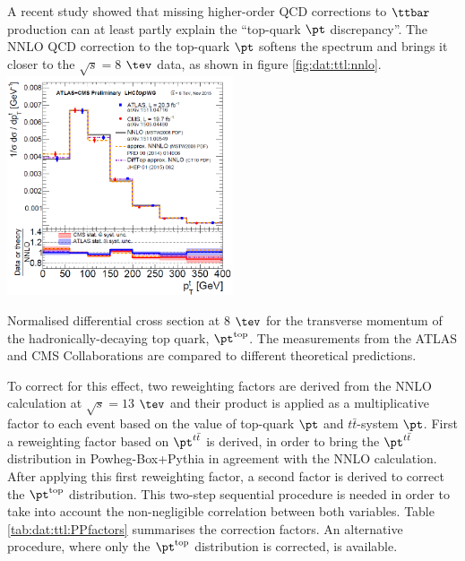 



A recent study \cite{PhysRevD.90.014006,Guzzi:2014wia} showed that missing higher-order QCD corrections to $\ttbar$ production can at least partly explain the ``top-quark $\pt$ discrepancy''. The NNLO QCD correction to the top-quark $\pt$ softens the spectrum and brings it closer to the $\sqrt{s}=8$ $\tev$ data, as shown in figure \ref{fig:dat:ttl:nnlo}.
\bfig[h!]
\centering
\includegraphics[width=0.5\textwidth]{figures/Datasamples/nnlo8tev.png}
\captionsetup{width=0.85\textwidth} \caption{\small Normalised differential cross section at 8 $\tev$ for the transverse momentum of the hadronically-decaying top quark, $\pt^{\rm top}$. The measurements from the ATLAS and CMS Collaborations are compared to different theoretical predictions.}
\label{fig:dat:ttl:nnlo}
\efig
To correct for this effect, two reweighting factors are derived from the NNLO calculation at $\sqrt{s}=13$ $\tev$ and their product is applied as a multiplicative factor to each event based on the value of top-quark $\pt$ and $t\bar{t}$-system $\pt$. First a reweighting factor based on $\pt^{t\bar{t}}$ is derived, in order to bring the $\pt^{t\bar{t}}$ distribution in {\sc Powheg-Box+Pythia} in agreement with the NNLO calculation. After applying this first reweighting factor, a second factor is derived to correct the $\pt^{\rm top}$ distribution. This two-step sequential procedure is needed in order to take into account the non-negligible correlation between both variables. Table \ref{tab:dat:ttl:PPfactors} summarises the correction factors. An alternative procedure, where only the $\pt^{\rm top}$ distribution is corrected, is available.
